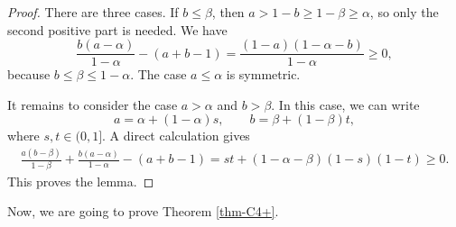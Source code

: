 \documentclass[10pt,a4paper]{amsart}
\renewcommand{\le}{\leqslant}
\renewcommand{\ge}{\geqslant}
\begin{document}
\begin{proof}
There are three cases.  If \(b\le \beta\), then
\(a>1-b\ge 1-\beta\ge\alpha\), so only the second positive part is needed.
We have
\[
\frac{b(a-\alpha)}{1-\alpha}-(a+b-1)
=
\frac{(1-a)(1-\alpha-b)}{1-\alpha}\ge0,
\]
because \(b\le\beta\le 1-\alpha\).  The case \(a\le\alpha\) is symmetric.

It remains to consider the case \(a>\alpha\) and \(b>\beta\).  In this case, we can write
\[
        a=\alpha+(1-\alpha)s,
        \qquad
        b=\beta+(1-\beta)t,
\]
where \(s,t\in(0,1]\).  
A direct calculation gives
\[
\begin{aligned}
\frac{a(b-\beta)}{1-\beta}
+
\frac{b(a-\alpha)}{1-\alpha}
-(a+b-1)                              =
        st+ (1-\alpha-\beta)(1-s)(1-t)\ge0.
\end{aligned}
\]
This proves the lemma.
\end{proof}


Now, we are going to prove Theorem \ref{thm-C4+}. 
\end{document}
